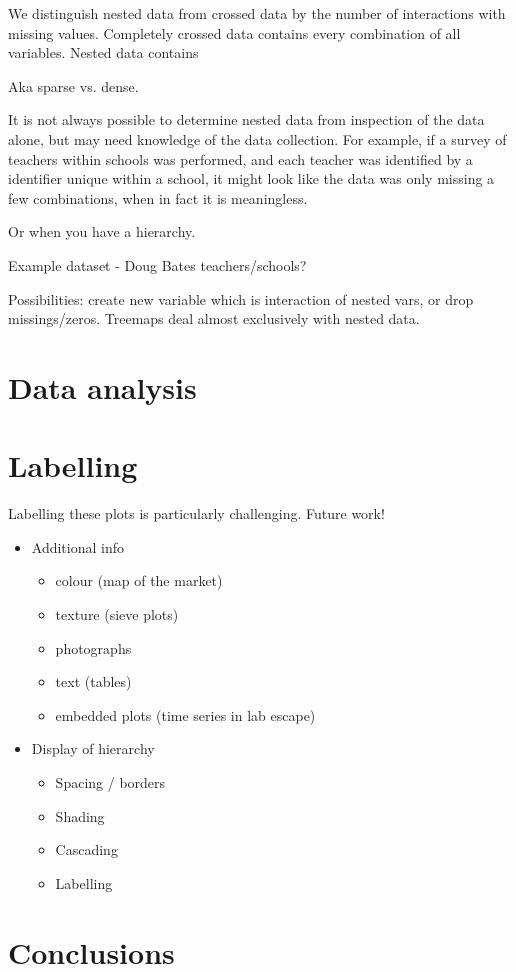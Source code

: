 \documentclass[letterpaper,oneside]{scrartcl}
\begin{document}
We distinguish nested data from crossed data by the number of interactions with missing values.  Completely crossed data contains every combination of all variables.  Nested data contains 

Aka sparse vs. dense.

It is not always possible to determine nested data from inspection of the data alone, but may need knowledge of the data collection.  For example, if a survey of teachers within schools was performed, and each teacher was identified by a identifier unique within a school, it might look like the data was only missing a few combinations, when in fact it is meaningless.  

Or when you have a hierarchy.

Example dataset - Doug Bates teachers/schools?

Possibilities: create new variable which is interaction of nested vars, or drop missings/zeros.  Treemaps deal almost exclusively with nested data.

\section{Data analysis} %
\label{sec:data_analysis}


\section{Labelling}
\label{sec:legends}

Labelling these plots is particularly challenging.  Future work!

\begin{itemize}
  \item Additional info 
  \begin{itemize}
    \item colour (map of the market)
    \item texture (sieve plots)
    \item photographs
    \item text (tables)
    \item embedded plots (time series in lab escape)
  \end{itemize}
  
  \item Display of hierarchy
  \begin{itemize}
    \item Spacing / borders
    \item Shading
    \item Cascading
    \item Labelling
  \end{itemize}
\end{itemize}

\section{Conclusions} %
\label{sec:conclusions}



\end{document}
